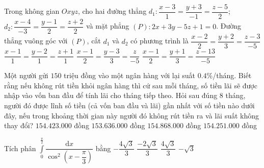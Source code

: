 \begin{ex}%
	Trong không gian $Oxyz$, cho hai đường thẳng $d_1\colon\dfrac{x-3}{1}=\dfrac{y+3}{-1}=\dfrac{z-5}{2}$; $d_2\colon\dfrac{x-4}{-3}=\dfrac{y-1}{2}=\dfrac{z+2}{2}$ và mặt phẳng $(P)\colon 2x+3y-5z+1=0$. Đường thẳng vuông góc với $(P)$, cắt $d_1$ và $d_2$ có phương trình là
	\choice
	{\True $\dfrac{x-2}{2}=\dfrac{y+2}{3}=\dfrac{z-3}{-5}$}
	{$\dfrac{x-1}{1}=\dfrac{y-2}{1}=\dfrac{z+1}{1}$}
		{$\dfrac{x-1}{2}=\dfrac{y-3}{3}=\dfrac{z}{-5}$}
	{$\dfrac{x-1}{2}=\dfrac{y+1}{3}=\dfrac{z-13}{-5}$}
\end{ex}
\begin{ex}%
	Một người gửi $150$ triệu đồng vào một ngân hàng với lại suất $0.4$\%/tháng. Biết rằng nếu không rút tiền khỏi ngân hàng thì cứ sau mỗi tháng, số tiền lãi sẽ được nhập vào vốn ban đầu để tính lãi cho tháng tiếp theo. Hỏi sau đúng $8$ tháng, người đó được lĩnh số tiền (cả vốn ban đầu và lãi) gần nhất với số tiền nào dưới đây, nếu trong khoảng thời gian này người đó không rút tiền ra và lãi suất không thay đổi?
	\choice
	{$154.423.000$ đồng}
	{$153.636.000$ đồng}
	{\True $154.868.000$ đồng}
	{$154.251.000$ đồng}
\end{ex}
\begin{ex}%
	Tích phân $\displaystyle\int\limits_{0}^{\frac{\pi}{2}} \dfrac{\mathrm{d}x}{\cos^2\left(x-\dfrac{\pi}{3}\right)}$ bằng
	\choice
	{$-\dfrac{4\sqrt{3}}{3}$}
	{$\dfrac{-2\sqrt{3}}{3}$}
	{\True $\dfrac{4\sqrt{3}}{3}$}
	{$-\sqrt{3}$}
\end{ex}
